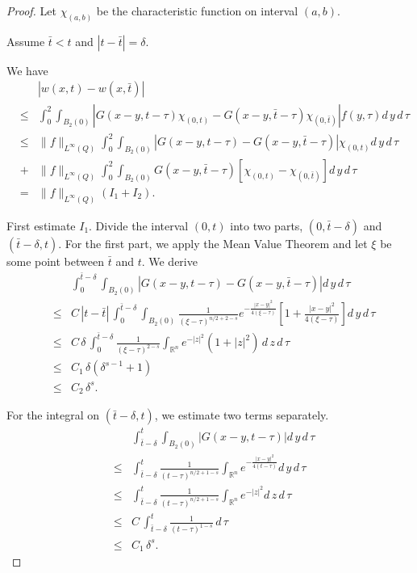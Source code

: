 \documentclass[12pt]{article}
\theoremstyle{remark}
\numberwithin{equation}{section}
\begin{document}
\begin{proof} Let $\chi_{(a,b)}$ be the characteristic function on interval $(a,b)$.

Assume $\bar{t} < t$ and $|t-\bar{t}|=\delta.$

We have
\begin{eqnarray}
&  & | w(x,t) - w(x, \bar{t}) | \nonumber \\
& \leq & \int_0^2 \int_{B_2(0)} \left| G(x-y, t-\tau) \chi_{(0,t)} - G(x-y, \bar{t} - \tau) \chi_{(0, \bar{t})} \right| f(y,\tau)  d \, y \, d \, \tau \nonumber \\
& \leq & \|f\|_{L^\infty(Q)} \int_0^2 \int_{B_2(0)} \left| G(x-y, t-\tau)- G(x-y, \bar{t} - \tau) \right| \chi_{(0,t)} d \, y \, d \, \tau \nonumber \\
& + & \|f\|_{L^\infty (Q)} \int_0^2 \int_{B_2(0)} G(x-y, \bar{t} - \tau) [ \chi_{(0,t)} - \chi_{(0,\bar{t})} ] d \, y \, d \, \tau  \nonumber \\
& = & \|f\|_{L^\infty (Q)} ( I_1 + I_2 ).
\label{3.30}
\end{eqnarray}

First estimate $I_1$. Divide the interval $(0,t)$ into two parts, $(0, \bar{t}-\delta)$ and $(\bar{t}-\delta, t)$. For the first part, we apply the Mean Value Theorem and let $\xi$ be some point between $\bar{t}$ and $t$. We derive
\begin{eqnarray}
& & \int_0^{\bar{t}-\delta}  \int_{B_2(0)} \left| G(x-y, t-\tau)- G(x-y, \bar{t} - \tau) \right| d \, y \, d \, \tau \nonumber \\
& \leq & C \, |t-\bar{t}| \,  \int_0^{\bar{t}-\delta}  \int_{B_2(0)} \frac{1}{(\xi -\tau)^{n/2 +2-s}} e^{-\frac{|x-y|^2}{4(\xi-\tau)}} \left[ 1 + \frac{|x-y|^2}{4(\xi-\tau)} \right] d \, y \, d \, \tau \nonumber \\
& \leq & C \, \delta \,  \int_0^{\bar{t}-\delta}  \frac{1}{(\xi -\tau)^{2-s}}  \int_{\mathbb{R}^n} e^{-|z|^2} (1+ |z|^2) \, d \, z \, d \, \tau \nonumber \\
& \leq & C_1 \, \delta ( \delta^{s-1} + 1) \nonumber \\
& \leq & C_2 \, \delta^s.
\label{3.31}
\end{eqnarray}

For the integral on $(\bar{t}-\delta, t)$, we estimate two terms separately.
\begin{eqnarray}
& & \int_{\bar{t}-\delta}^t \int_{B_2(0)} | G(x-y, t-\tau) | d \, y \, d \, \tau \nonumber \\
& \leq & \int_{\bar{t}-\delta}^t  \frac{1}{(t -\tau)^{n/2 +1-s}}\int_{\mathbb{R}^n} e^{-\frac{|x-y|^2}{4(t-\tau)}} d \, y \, d \, \tau \nonumber \\
& \leq & \int_{\bar{t}-\delta}^t  \frac{1}{(t -\tau)^{n/2 +1-s}}\int_{\mathbb{R}^n} e^{-|z|^2} d \, z \, d \, \tau \nonumber \\
& \leq & C \, \int_{\bar{t}-\delta}^t  \frac{1}{(t -\tau)^{1-s}} \, d \, \tau \nonumber \\
& \leq & C_1 \, \delta^s.
\label{3.32}
\end{eqnarray}


\end{proof}
\end{document}
